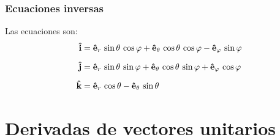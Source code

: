 \documentclass[12pt]{beamer}
\begin{document}
\begin{frame}
\frametitle{Ecuaciones inversas}
Las ecuaciones son:
\pause
\begin{align*}
\vu{i} &= \vu{e}_{r} \, \sin \theta \, \cos \varphi + \vu{e}_{\theta} \, \cos \theta \, \cos \varphi - \vu{e}_{\varphi} \, \sin \varphi \\[0.5em]
\vu{j} &= \vu{e}_{r} \, \sin \theta \, \sin \varphi + \vu{e}_{\theta} \, \cos \theta \, \sin \varphi + \vu{e}_{\varphi} \, \cos \varphi \\[0.5em]
\vu{k} &= \vu{e}_{r} \, \cos \theta - \vu{e}_{\theta} \, \sin \theta
\end{align*}
\end{frame}

\section*{Derivadas de vectores unitarios}
\end{document}
